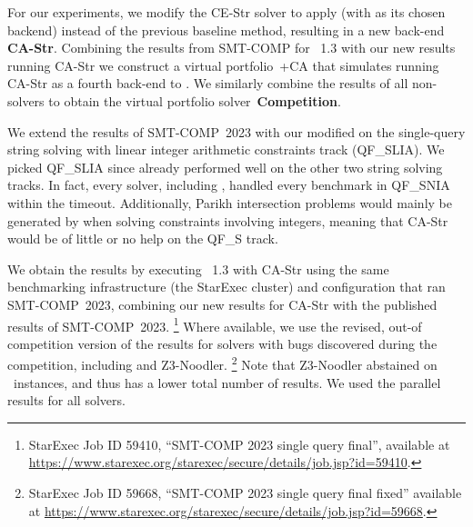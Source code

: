 For our experiments, we modify the CE-Str solver to apply \Catra{}
 (with \Calculus{} as its chosen backend)
instead of the previous baseline method, resulting in a new back-end
\textbf{CA-Str}. Combining the results from SMT-COMP for \Ostrich{}~1.3 
with our new results running CA-Str we construct a virtual 
portfolio~\Ostrich{}+CA that simulates running CA-Str as a fourth
back-end to \Ostrich{}. We similarly combine the results of all non-\Ostrich{} solvers
to obtain the virtual portfolio solver~\textbf{Competition}.

%
%

We extend the results of SMT-COMP~2023 with our modified \Ostrich{}
on the single-query string solving with linear integer arithmetic constraints
track (QF\_SLIA). We picked QF\_SLIA since
\Ostrich{} already performed well on the other two string solving tracks. In fact,
every solver, including \Ostrich{}, handled every benchmark in QF\_SNIA within the timeout.
Additionally, Parikh intersection problems would mainly be generated by \Ostrich{} when
solving constraints involving integers, meaning that CA-Str would be of little or no
help on the QF\_S track.

We obtain the results by executing \Ostrich{}~1.3 with CA-Str using
the same benchmarking infrastructure (the StarExec cluster)
and configuration that ran SMT-COMP~2023, combining our new results for CA-Str with the
published results of SMT-COMP~2023.
\footnote{StarExec Job ID 59410, \enquote{SMT-COMP 2023 single query final}, 
available at \url{https://www.starexec.org/starexec/secure/details/job.jsp?id=59410}.} 
Where available, we use the revised, out-of
competition version of the results for solvers with bugs discovered during
the competition, including \Ostrich{} and Z3-Noodler. 
\footnote{StarExec Job ID 59668, \enquote{SMT-COMP 2023 single query final fixed} available at
\url{https://www.starexec.org/starexec/secure/details/job.jsp?id=59668}.}
Note that Z3-Noodler abstained on ~instances, and thus has a lower total number of results.
We used the parallel results for all solvers.

